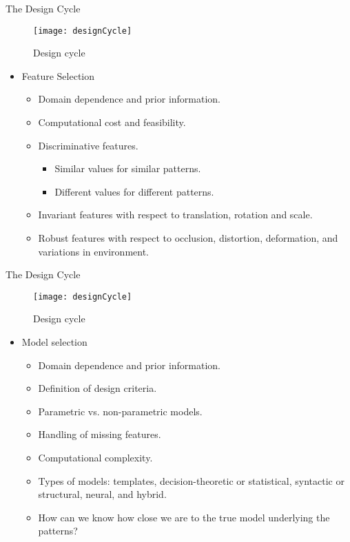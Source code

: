 \begin{frame}{The Design Cycle}
\begin{figure}
\texttt{[image: designCycle]}
\caption{Design cycle}
\end{figure}
\vspace{-20pt}
\begin{itemize}
\setlength{\itemsep}{12pt}
\item {\color{mycolor2}Feature Selection}
\begin{itemize}
\setlength{\itemsep}{3pt}
\item Domain dependence and prior information.
\item Computational cost and feasibility.
\item Discriminative features.
\begin{itemize}
\item Similar values for similar patterns.
\item Different values for different patterns.
\end{itemize}
\item Invariant features with respect to translation, rotation and
scale.
\item Robust features with respect to occlusion, distortion,
deformation, and variations in environment.
\end{itemize}
\end{itemize}
\end{frame}

\begin{frame}{The Design Cycle}
\begin{figure}
\texttt{[image: designCycle]}
\caption{Design cycle}
\end{figure}
\vspace{-20pt}
\begin{itemize}
\item {\color{mycolor2}Model selection}
\begin{itemize}
\setlength{\itemsep}{3pt}
\item Domain dependence and prior information.
\item Definition of design criteria.
\item Parametric vs. non-parametric models.
\item Handling of missing features.
\item Computational complexity.
\item Types of models: templates, decision-theoretic or statistical, syntactic or structural, neural, and hybrid.
\item How can we know how close we are to the true model
underlying the patterns?
\end{itemize}
\end{itemize}
\end{frame}

